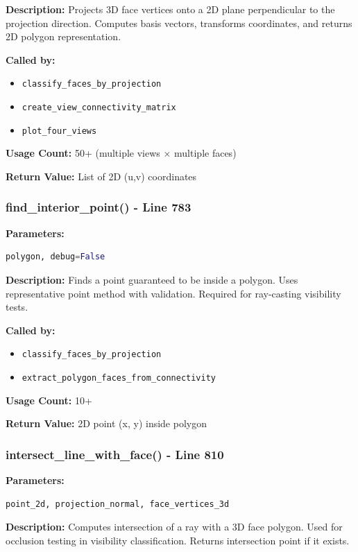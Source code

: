 \documentclass[11pt,a4paper]{article}
\begin{document}
\textbf{Description:}
Projects 3D face vertices onto a 2D plane perpendicular to the projection direction. Computes basis vectors, transforms coordinates, and returns 2D polygon representation.

\textbf{Called by:}
\begin{itemize}
    \item \texttt{classify\_faces\_by\_projection}
    \item \texttt{create\_view\_connectivity\_matrix}
    \item \texttt{plot\_four\_views}
\end{itemize}

\textbf{Usage Count:} 50+ (multiple views × multiple faces)

\textbf{Return Value:} List of 2D (u,v) coordinates

\subsubsection{find\_interior\_point() - Line 783}
\textbf{Parameters:}
\begin{lstlisting}[language=Python]
polygon, debug=False
\end{lstlisting}

\textbf{Description:}
Finds a point guaranteed to be inside a polygon. Uses representative point method with validation. Required for ray-casting visibility tests.

\textbf{Called by:}
\begin{itemize}
    \item \texttt{classify\_faces\_by\_projection}
    \item \texttt{extract\_polygon\_faces\_from\_connectivity}
\end{itemize}

\textbf{Usage Count:} 10+

\textbf{Return Value:} 2D point (x, y) inside polygon

\subsubsection{intersect\_line\_with\_face() - Line 810}
\textbf{Parameters:}
\begin{lstlisting}[language=Python]
point_2d, projection_normal, face_vertices_3d
\end{lstlisting}

\textbf{Description:}
Computes intersection of a ray with a 3D face polygon. Used for occlusion testing in visibility classification. Returns intersection point if it exists.
\end{document}
